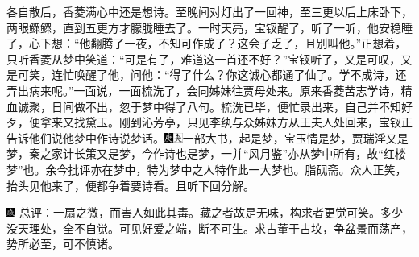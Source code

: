 各自散后，香菱满心中还是想诗。至晚间对灯出了一回神，至三更以后上床卧下，两眼鳏鳏，直到五更方才朦胧睡去了。一时天亮，宝钗醒了，听了一听，他安稳睡了，心下想：``他翻腾了一夜，不知可作成了？这会子乏了，且别叫他。''正想着，只听香菱从梦中笑道：``可是有了，难道这一首还不好？''宝钗听了，又是可叹，又是可笑，连忙唤醒了他，问他：``得了什么？你这诚心都通了仙了。学不成诗，还弄出病来呢。''一面说，一面梳洗了，会同姊妹往贾母处来。原来香菱苦志学诗，精血诚聚，日间做不出，忽于梦中得了八句。梳洗已毕，便忙录出来，自己并不知好歹，便拿来又找黛玉。刚到沁芳亭，只见李纨与众姊妹方从王夫人处回来，宝钗正告诉他们说他梦中作诗说梦话。{\includegraphics[width=3mm]{../Images/00004}\includegraphics[width=3mm]{../Images/00012}\footnotesize \kaishu 一部大书，起是梦，宝玉情是梦，贾瑞淫又是梦，秦之家计长策又是梦，今作诗也是梦，一并``风月鉴''亦从梦中所有，故``红楼梦''也。余今批评亦在梦中，特为梦中之人特作此一大梦也。脂砚斋。}众人正笑，抬头见他来了，便都争着要诗看。且听下回分解。

{\includegraphics[width=3mm]{../Images/00005}  \kaishu 总评：一扇之微，而害人如此其毒。藏之者故是无味，构求者更觉可笑。多少没天理处，全不自觉。可见好爱之端，断不可生。求古董于古坟，争盆景而荡产，势所必至，可不慎诸。}
